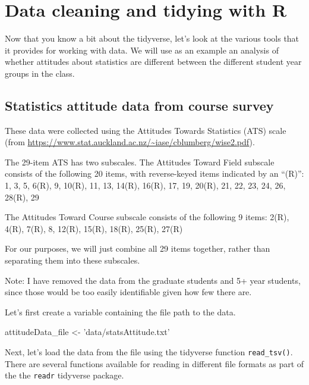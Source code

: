 \documentclass[12pt,]{book}
\newenvironment{Shaded}{\begin{snugshade}}{\end{snugshade}}
\newcommand{\NormalTok}[1]{#1}
\newcommand{\StringTok}[1]{\textcolor[rgb]{0.31,0.60,0.02}{#1}}
\begin{document}
\hypertarget{data-cleaning-and-tidying-with-r}{%
\section{Data cleaning and tidying with R}\label{data-cleaning-and-tidying-with-r}}

Now that you know a bit about the tidyverse, let's look at the various tools that it provides for working with data. We will use as an example an analysis of whether attitudes about statistics are different between the different student year groups in the class.

\hypertarget{statistics-attitude-data-from-course-survey}{%
\subsection{Statistics attitude data from course survey}\label{statistics-attitude-data-from-course-survey}}

These data were collected using the Attitudes Towards Statistics (ATS) scale (from \url{https://www.stat.auckland.ac.nz/~iase/cblumberg/wise2.pdf}).

The 29-item ATS has two subscales. The Attitudes Toward Field subscale consists of the following 20 items, with reverse-keyed items indicated by an ``(R)'':
1, 3, 5, 6(R), 9, 10(R), 11, 13, 14(R), 16(R), 17, 19, 20(R), 21, 22, 23, 24, 26, 28(R), 29

The Attitudes Toward Course subscale consists of the following 9 items:
2(R), 4(R), 7(R), 8, 12(R), 15(R), 18(R), 25(R), 27(R)

For our purposes, we will just combine all 29 items together, rather than separating them into these subscales.

Note: I have removed the data from the graduate students and 5+ year students, since those would be too easily identifiable given how few there are.

Let's first create a variable containing the file path to the data.

\begin{Shaded}
\begin{Highlighting}[]
\NormalTok{attitudeData_file <-}\StringTok{ 'data/statsAttitude.txt'}
\end{Highlighting}
\end{Shaded}

Next, let's load the data from the file using the tidyverse function \texttt{read\_tsv()}. There are several functions available for reading in different file formats as part of the the \texttt{readr} tidyverse package.
\end{document}
